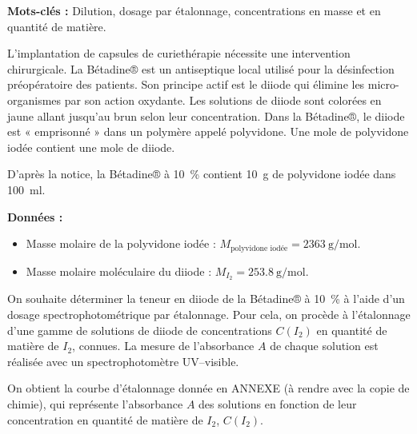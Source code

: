 \newpage
{}


\label{exo:antiseptique}

\textbf{Mots-clés :} Dilution, dosage par étalonnage, concentrations en masse et en quantité
de matière.
\medskip

L'implantation de capsules de curiethérapie nécessite une intervention chirurgicale.
La Bétadine® est un antiseptique local utilisé pour la désinfection préopératoire des patients.
Son principe actif est le diiode  qui élimine les micro-organismes par son action oxydante.
Les solutions de diiode sont colorées en jaune allant jusqu'au brun selon leur concentration.
Dans la Bétadine®, le diiode est « emprisonné » dans un polymère appelé polyvidone.
Une mole de polyvidone iodée contient une mole de diiode.
\medskip

D'après la notice, la Bétadine® à \qty{10}{\percent} contient \qty{10}{\g} de polyvidone iodée dans \qty{100}{\ml}.

\textbf{Données :}
\begin{itemize}
  \item Masse molaire de la polyvidone iodée : $M_\text{polyvidone iodée} = \qty{2363}{\g\per\mole}$.
  \item Masse molaire moléculaire du diiode : $M_{I_2} = \qty{253,8}{\g\per\mole}$.
\end{itemize}

On souhaite déterminer la teneur en diiode de la Bétadine® à \qty{10}{\percent} à l'aide d'un dosage spectrophotométrique par étalonnage.
Pour cela, on procède à l'étalonnage d'une gamme de solutions de diiode de concentrations $C(I_2)$ en quantité de matière de $I_2$, connues.
La mesure de l'absorbance $A$ de chaque solution est réalisée avec un spectrophotomètre UV–visible.
\medskip 

On obtient la courbe d'étalonnage donnée en ANNEXE (à rendre avec la copie de
chimie), qui représente l'absorbance $A$ des solutions en fonction de leur concentration
en quantité de matière de $I_2$, $C(I_2)$.



